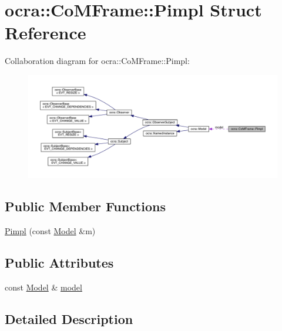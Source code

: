 \hypertarget{structocra_1_1CoMFrame_1_1Pimpl}{}\section{ocra\+:\+:Co\+M\+Frame\+:\+:Pimpl Struct Reference}
\label{structocra_1_1CoMFrame_1_1Pimpl}


Collaboration diagram for ocra\+:\+:Co\+M\+Frame\+:\+:Pimpl\+:
\nopagebreak
\begin{figure}[H]
\begin{center}
\leavevmode
\includegraphics[width=350pt]{d9/d95/structocra_1_1CoMFrame_1_1Pimpl__coll__graph}
\end{center}
\end{figure}
\subsection*{Public Member Functions}
\begin{DoxyCompactItemize}
\item 
\hyperlink{structocra_1_1CoMFrame_1_1Pimpl_a2b4badc79278777e9f5a570e7b583905}{Pimpl} (const \hyperlink{classocra_1_1Model}{Model} \&m)
\end{DoxyCompactItemize}
\subsection*{Public Attributes}
\begin{DoxyCompactItemize}
\item 
const \hyperlink{classocra_1_1Model}{Model} \& \hyperlink{structocra_1_1CoMFrame_1_1Pimpl_aa6727f07a45efaed605571d416ff4727}{model}
\end{DoxyCompactItemize}


\subsection{Detailed Description}


